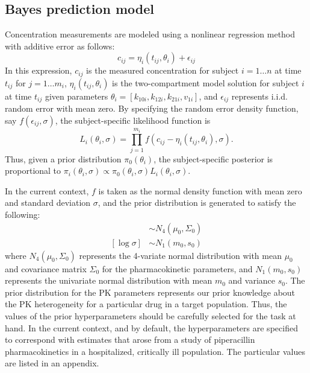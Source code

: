 \documentclass{article}\usepackage[]{graphicx}\usepackage[]{color}
\begin{document}
\subsection{Bayes prediction model} %
Concentration measurements are modeled using a nonlinear regression method with additive error as follows:
\begin{displaymath}
c_{ij} = \eta_i(t_{ij}, \theta_i) + \epsilon_{ij}
\end{displaymath}
\noindent In this expression, $c_{ij}$ is the measured concentration for subject $i = 1 \ldots n$ at time $t_{ij}$ for $j = 1 \ldots m_i$, $\eta_i(t_{ij}, \theta_i)$ is the two-compartment model solution for subject $i$ at time $t_{ij}$ given parameters $\theta_i = [k_{10i}, k_{12i}, k_{21i}, v_{1i}]$, and $\epsilon_{ij}$ represents i.i.d. random error with mean zero. By specifying the random error density function, say $f(\epsilon_{ij}, \sigma)$, the subject-specific likelihood function is
\begin{displaymath}
L_i(\theta_i, \sigma) = \prod_{j=1}^{m_i} f(c_{ij} - \eta_i(t_{ij}, \theta_i), \sigma).
\end{displaymath}
\noindent Thus, given a prior distribution $\pi_0(\theta_i)$, the subject-specific posterior is proportional to $\pi_i(\theta_i, \sigma) \propto \pi_0(\theta_i,\sigma)L_i(\theta_i,\sigma)$.

In the current context, $f$ is taken as the normal density function with mean zero and standard deviation $\sigma$, and the prior distribution is generated to satisfy the following:
\begin{align}
[\log \theta_i] &\sim N_4(\mu_0, \Sigma_0) \\
[\log \sigma] &\sim N_1(m_0, s_0)
\end{align}
\noindent where $N_4(\mu_0, \Sigma_0)$ represents the 4-variate normal distribution with mean $\mu_0$ and covariance matrix $\Sigma_0$ for the pharmacokinetic parameters, and $N_1(m_0, s_0)$ represents the univariate normal distribution with mean $m_0$ and variance $s_0$. The prior distribution for the PK parameters represents our prior knowledge about the PK heterogeneity for a particular drug in a target population. Thus, the values of the prior hyperparameters should be carefully selected for the task at hand. In the current context, and by default, the hyperparameters are specified to correspond with estimates that arose from a study of piperacillin pharmacokinetics in a hospitalized, critically ill population. The particular values are listed in an appendix.
\end{document}
